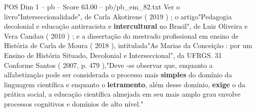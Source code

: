 \begin{textsample}{POS Dim 1 – pb – Score 63.00 – pb/pb\_em\_82.txt}
Ver o livro"Interseccionalidade", de Carla Akotirene ( 2019 ) ; o artigo"Pedagogia decolonial e educação antirracista e \textbf{intercultural} no Brasil", de Luiz Oliveira e Vera Candau ( 2010 ) ; e a dissertação do mestrado profissional em ensino de História de Carla de Moura ( 2018 ), intitulada"As Marias da Conceição : por um Ensino de História Situado, Decolonial e Interseccional", da UFRGS. 31 Conforme Santos ( 2007, p. 479 ),"Deve -se observar que, enquanto a alfabetização pode ser considerada o processo mais \textbf{simples} do domínio da linguagem científica e enquanto o \textbf{letramento}, além desse domínio, \textbf{exige} o da prática social, a educação científica almejada em seu mais amplo grau envolve processos cognitivos e domínios de alto nível."

\end{textsample}
